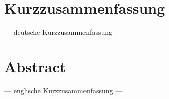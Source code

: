  \chapter*{Kurzzusammenfassung}

--- deutsche Kurzzusammenfassung ---


\chapter*{Abstract}

--- englische Kurzzusammenfassung ---


